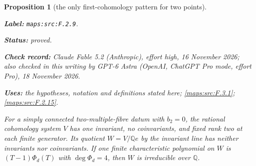 \documentclass[11pt,a4paper]{article}
\newtheorem{proposition}[proposition]{Proposition}
\theoremstyle{definition}
\newcommand{\StatementRecord}[4]{\par\smallskip\begingroup\upshape\raggedright\noindent\textbf{Label:} \nolinkurl{#1}.\par\noindent\textbf{Status:} #2.\par\noindent\textbf{Check record:} #3.\par\noindent\textbf{Uses:} #4.\par\endgroup\smallskip}
\newcommand{\CurrentChecker}{GPT-6 Astra (OpenAI, ChatGPT Pro mode, effort Pro), 18 November 2026}
\begin{document}
\begin{proposition}[the only first-cohomology pattern for two points]\label{maps:src:F.2.9}
\StatementRecord{maps:src:F.2.9}{proved}{Claude Fable 5.2 (Anthropic), effort high, 16 November 2026; also checked in this writing by \CurrentChecker}{the hypotheses, notation and definitions stated here; \cref{maps:src:F.3.1}; \cref{maps:src:F.2.15}}


For a simply connected two-multiple-fibre datum with $b_2=0$,
the rational
cohomology system $V$ has one invariant, no coinvariants,
and fixed rank two at each finite generator.  Its quotient
$W=V/\mathbb Qe$ by the invariant line has neither invariants
nor coinvariants.  If one finite characteristic polynomial
on $W$ is $(T-1)\Phi_d(T)$ with $\deg\Phi_d=4$, then $W$
is irreducible over $\mathbb Q$.

\end{proposition}
\end{document}
